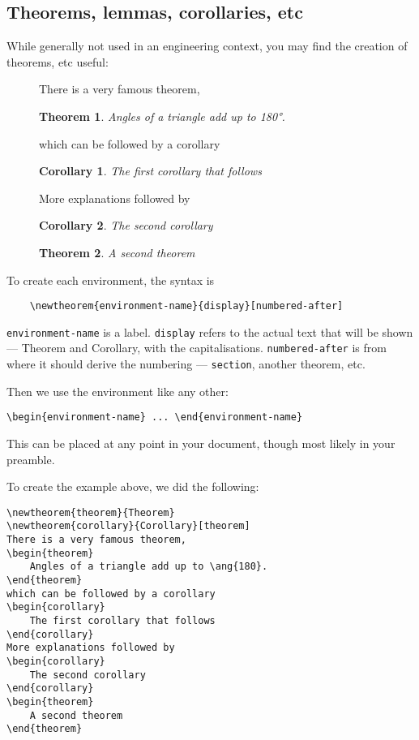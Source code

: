 \subsection{Theorems, lemmas, corollaries, etc}
While generally not used in an engineering context, you may find the creation of theorems, etc useful:\\

\begin{figure}[h]
    \newtheorem{theorem}{Theorem}
    \newtheorem{corollary}{Corollary}[theorem]
    There is a very famous theorem,
    \begin{theorem}
        Angles of a triangle add up to \ang{180}.
    \end{theorem}
    which can be followed by a corollary
    \begin{corollary}
        The first corollary that follows
    \end{corollary}
    More explanations followed by
    \begin{corollary}
        The second corollary
    \end{corollary}
    \begin{theorem}
        A second theorem
    \end{theorem}
\end{figure}


To create each environment, the syntax is
\begin{lstlisting}
    \newtheorem{environment-name}{display}[numbered-after]
\end{lstlisting}
\texttt{environment-name} is a label.
\texttt{display} refers to the actual text that will be shown --- Theorem and Corollary, with the capitalisations.
\texttt{numbered-after} is from where it should derive the numbering --- \texttt{section}, another theorem, etc.

Then we use the environment like any other:
\begin{lstlisting}
\begin{environment-name} ... \end{environment-name}
\end{lstlisting}
This can be placed at any point in your document, though most likely in your preamble.

To create the example above, we did the following:
\begin{lstlisting}
\newtheorem{theorem}{Theorem}
\newtheorem{corollary}{Corollary}[theorem]
There is a very famous theorem,
\begin{theorem}
    Angles of a triangle add up to \ang{180}.
\end{theorem}
which can be followed by a corollary
\begin{corollary}
    The first corollary that follows
\end{corollary}
More explanations followed by
\begin{corollary}
    The second corollary
\end{corollary}
\begin{theorem}
    A second theorem
\end{theorem}
\end{lstlisting}